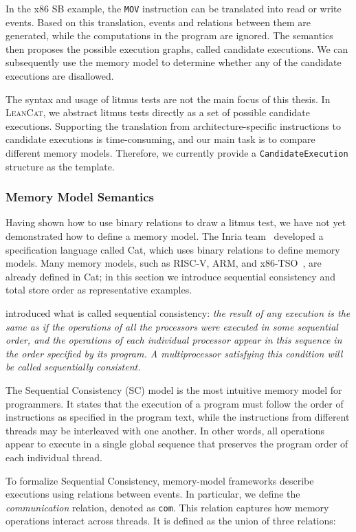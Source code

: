 In the x86 SB example, the \texttt{MOV} instruction can be translated into read or write events. Based on this translation, events and relations between them are generated, while the computations in the program are ignored. The semantics then proposes the possible execution graphs, called candidate executions. We can subsequently use the memory model to determine whether any of the candidate executions are disallowed.

The syntax and usage of litmus tests are not the main focus of this thesis. In \textsc{LeanCat}, we abstract litmus tests directly as a set of possible candidate executions. Supporting the translation from architecture-specific instructions to candidate executions is time-consuming, and our main task is to compare different memory models. Therefore, we currently provide a \texttt{CandidateExecution} structure as the template.

\subsubsection{Memory Model Semantics}

Having shown how to use binary relations to draw a litmus test, we have not yet demonstrated how to define a memory model. The Inria team~\citep{10.1145/2627752} developed a specification language called Cat, which uses binary relations to define memory models. Many memory models, such as RISC-V, ARM, and x86-TSO~\citep{sewell2010x86tso}, are already defined in Cat; in this section we introduce sequential consistency and total store order as representative examples.

\citet{lam1675439} introduced what is called sequential consistency: \textit{the result of any execution is the same as if the operations of all the processors were executed in some sequential order, and the operations of each individual processor appear in this sequence in the order specified by its program. A multiprocessor satisfying this condition will be called sequentially consistent.}

The Sequential Consistency (SC) model is the most intuitive memory model for
programmers. It states that the execution of a program must follow the order of
instructions as specified in the program text, while the instructions from
different threads may be interleaved with one another. In other words, all
operations appear to execute in a single global sequence that preserves the
program order of each individual thread.

To formalize Sequential Consistency, memory-model frameworks describe executions
using relations between events. In particular, we define the \textit{communication}
relation, denoted as \texttt{com}. This relation captures how memory operations
interact across threads. It is defined as the union of three relations:

